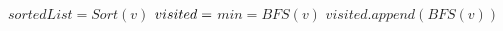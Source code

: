 \State $sortedList = Sort(v)$ 
\State $visited = \empty$
        \State $min = BFS(v)$
        \State $visited.append(BFS(v))$
    \EndIf
\EndFor
\EndProcedure